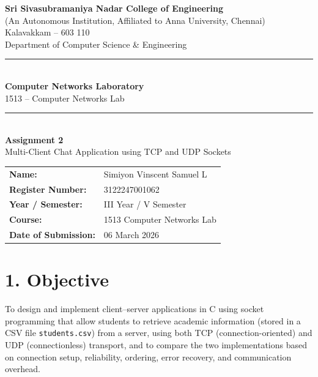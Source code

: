 \documentclass[11pt]{article}
\title{\vspace{-2cm}}
\date{}
\begin{document}
\begin{titlepage}
\centering
\vspace*{1cm}
{\large \textbf{Sri Sivasubramaniya Nadar College of Engineering}}\\
{\small (An Autonomous Institution, Affiliated to Anna University, Chennai)}\\
{\small Kalavakkam -- 603 110}\\[0.3cm]
{\small Department of Computer Science \& Engineering}\\[1.5cm]

\rule{\linewidth}{0.5mm}\\[0.4cm]
{\LARGE \textbf{Computer Networks Laboratory}}\\[0.3cm]
{\Large 1513 -- Computer Networks Lab}\\[0.4cm]
\rule{\linewidth}{0.5mm}\\[1.5cm]

{\huge \textbf{Assignment 2}}\\[0.4cm]
{\Large Multi-Client Chat Application using TCP and UDP Sockets}\\[2cm]

\begin{center}
\begin{tabular}{ll}
\textbf{Name:} & Simiyon Vinscent Samuel L \\[0.2cm]
\textbf{Register Number:} & 3122247001062 \\[0.2cm]
\textbf{Year / Semester:} & III Year / V Semester \\[0.2cm]
\textbf{Course:} & 1513 Computer Networks Lab \\[0.2cm]
\textbf{Date of Submission:} & 06 March 2026 \\[0.2cm]
\end{tabular}
\end{center}

\vfill
\end{titlepage}

\section*{1. Objective}
To design and implement client--server applications in C using socket programming that allow
students to retrieve academic information (stored in a CSV file \texttt{students.csv}) from a
server, using both TCP (connection-oriented) and UDP (connectionless) transport, and to compare
the two implementations based on connection setup, reliability, ordering, error recovery, and
communication overhead.
\end{document}
